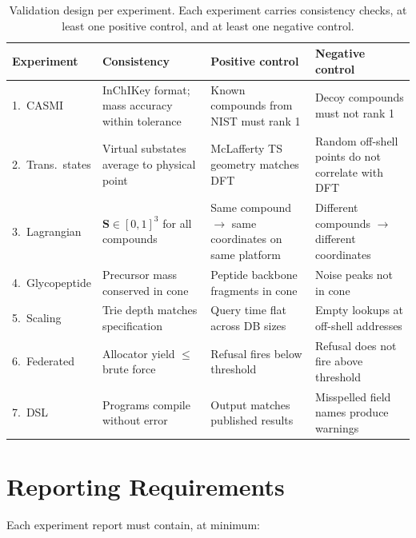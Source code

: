 \documentclass[11pt,a4paper]{article}
\theoremstyle{planstyle}
\theoremstyle{definition}
\theoremstyle{remark}
\newcommand{\Sv}{\mathbf{S}}
\begin{document}
\begin{table}[htbp]
\centering
\small
\caption{Validation design per experiment. Each experiment carries
consistency checks, at least one positive control, and at least one
negative control.}
\label{tab:validation-design}
\begin{tabular}{@{}lp{3cm}p{3cm}p{3cm}@{}}
\toprule
\textbf{Experiment} & \textbf{Consistency} & \textbf{Positive control} &
\textbf{Negative control} \\
\midrule
1.\ CASMI &
  InChIKey format; mass accuracy within tolerance &
  Known compounds from NIST must rank 1 &
  Decoy compounds must not rank 1 \\[4pt]
2.\ Trans.\ states &
  Virtual substates average to physical point &
  McLafferty TS geometry matches DFT &
  Random off-shell points do not correlate with DFT \\[4pt]
3.\ Lagrangian &
  $\Sv \in [0,1]^3$ for all compounds &
  Same compound $\rightarrow$ same coordinates on same platform &
  Different compounds $\rightarrow$ different coordinates \\[4pt]
4.\ Glycopeptide &
  Precursor mass conserved in cone &
  Peptide backbone fragments in cone &
  Noise peaks not in cone \\[4pt]
5.\ Scaling &
  Trie depth matches specification &
  Query time flat across DB sizes &
  Empty lookups at off-shell addresses \\[4pt]
6.\ Federated &
  Allocator yield $\leq$ brute force &
  Refusal fires below threshold &
  Refusal does not fire above threshold \\[4pt]
7.\ DSL &
  Programs compile without error &
  Output matches published results &
  Misspelled field names produce warnings \\
\bottomrule
\end{tabular}
\end{table}

\section{Reporting Requirements}
\label{sec:reporting}

Each experiment report must contain, at minimum:
\end{document}
